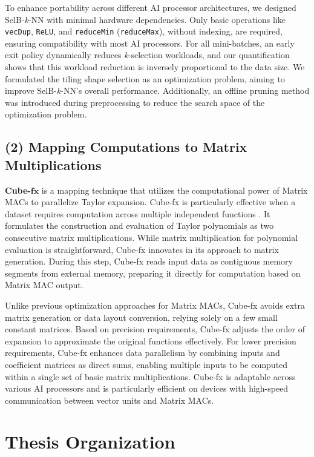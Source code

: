 To enhance portability across different AI processor architectures, we designed SelB-\textit{k}-NN with minimal hardware dependencies. Only basic operations like \verb|vecDup|, \verb|ReLU|, and \verb|reduceMin| (\verb|reduceMax|), without indexing, are required, ensuring compatibility with most AI processors. For all mini-batches, an early exit policy dynamically reduces \textit{k}-selection workloads, and our quantification shows that this workload reduction is inversely proportional to the data size. We formulated the tiling shape selection as an optimization problem, aiming to improve SelB-\textit{k}-NN's overall performance. Additionally, an offline pruning method was introduced during preprocessing to reduce the search space of the optimization problem.

\subsection{(2) Mapping Computations to Matrix Multiplications}

\textbf{Cube-}$\mathbf{fx}$ is a mapping technique that utilizes the computational power of Matrix MACs to parallelize Taylor expansion. Cube-fx is particularly effective when a dataset requires computation across multiple independent functions \cite{boyd2004convex, guyon2006introduction, DBLP:conf/icpr/ManessiR18}. It formulates the construction and evaluation of Taylor polynomials as two consecutive matrix multiplications. While matrix multiplication for polynomial evaluation is straightforward, Cube-fx innovates in its approach to matrix generation. During this step, Cube-fx reads input data as contiguous memory segments from external memory, preparing it directly for computation based on Matrix MAC output.

Unlike previous optimization approaches for Matrix MACs, Cube-fx avoids extra matrix generation or data layout conversion, relying solely on a few small constant matrices. Based on precision requirements, Cube-fx adjusts the order of expansion to approximate the original functions effectively. For lower precision requirements, Cube-fx enhances data parallelism by combining inputs and coefficient matrices as direct sums, enabling multiple inputs to be computed within a single set of basic matrix multiplications. Cube-fx is adaptable across various AI processors and is particularly efficient on devices with high-speed communication between vector units and Matrix MACs.

\section{Thesis Organization}
\label{sec_1_4_organization}

